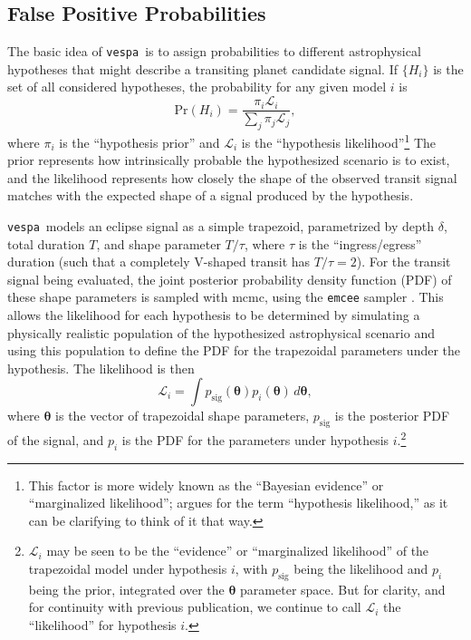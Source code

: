 \documentclass{emulateapj}
\newcommand{\vespa}{\texttt{vespa}}
\newcommand{\bvec}[1]{{\ensuremath{\boldsymbol{#1}}}}
\begin{document}

\subsection{False Positive Probabilities}
\label{sec:methods:fpp}

The basic idea of \vespa\ is to assign probabilities to different
astrophysical hypotheses that might describe a transiting planet
candidate signal.  If $\{H_i\}$ is the set of all considered
hypotheses, the probability for any given model $i$ is
\begin{equation}
  \label{eq:prob}
  \mathrm{Pr}\left(H_i\right) = \frac{\pi_i \mathcal
    L_i}{\displaystyle \sum_j \pi_j \mathcal L_j},
\end{equation}
where $\pi_i$ is the ``hypothesis prior'' and $\mathcal L_i$ is the
``hypothesis likelihood''\footnote{This factor is more widely known as
  the ``Bayesian evidence'' or ``marginalized likelihood'';
  \citet{Morton:2014b} argues for the term ``hypothesis likelihood,''
  as it can be clarifying to think of it that way.}
The prior represents how intrinsically probable the hypothesized
scenario is to exist, and the likelihood represents how closely the
shape of the observed transit signal matches with the expected shape
of a signal produced by the hypothesis.

\vespa\ models an eclipse signal as a simple trapezoid, parametrized
by depth $\delta$, total duration $T$, and shape parameter $T / \tau$,
where $\tau$ is the ``ingress/egress'' duration (such that a
completely V-shaped transit has $T/\tau = 2$).  For the transit signal
being evaluated, the joint posterior probability density function
(PDF) of these shape parameters is sampled with \ac{mcmc}, using the
\texttt{emcee} sampler \citep{emcee}.  This allows the likelihood for
each hypothesis to be determined by simulating a physically realistic
population of the hypothesized astrophysical scenario and using this
population to define the PDF for the trapezoidal parameters under the
hypothesis.  The likelihood is then
\begin{equation}
  \label{eq:lhood}
  \mathcal L_i = \displaystyle \int p_\mathrm{sig}\left(\bvec{\theta}\right)
                                    p_i\left(\bvec{\theta}\right)\,d\bvec{\theta},
\end{equation}
where $\bvec{\theta}$ is the vector of trapezoidal shape parameters,
$p_\mathrm{sig}$ is the posterior PDF of the signal, and $p_i$ is the
PDF for the parameters under hypothesis $i$.\footnote{$\mathcal L_i$
  may be seen to be the ``evidence'' or ``marginalized likelihood'' of
  the trapezoidal model under hypothesis $i$, with $p_\mathrm{sig}$
  being the likelihood and $p_i$ being the prior, integrated over the
  $\bvec{\theta}$ parameter space.  But for clarity, and for
  continuity with previous publication, we continue to call $\mathcal
  L_i$ the ``likelihood'' for hypothesis $i$.}
\end{document}
